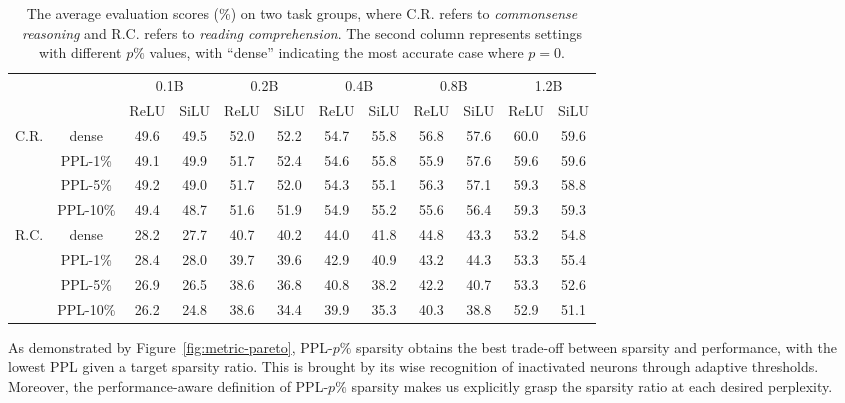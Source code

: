 \documentclass{article} %
\begin{document}
\begin{table}[t]
\caption{The average evaluation scores (\%) on two task groups, where C.R. refers to \textit{commonsense reasoning} and R.C. refers to \textit{reading comprehension}. The second column represents settings with different $p\%$ values, with ``dense'' indicating the most accurate case where $p=0$.}
\label{table:average-evaluation-results}
\footnotesize
\setlength{\tabcolsep}{1.2mm}
\begin{center}
\begin{tabular}{c|c|cccccccccc}
\toprule
\multicolumn{2}{c|}{} & \multicolumn{2}{c|}{0.1B} & \multicolumn{2}{c|}{0.2B} & \multicolumn{2}{c|}{0.4B} & \multicolumn{2}{c|}{0.8B} & \multicolumn{2}{c}{1.2B} \\  
\multicolumn{2}{c|}{} & ReLU & \multicolumn{1}{c|}{SiLU} & ReLU & \multicolumn{1}{c|}{SiLU} & ReLU & \multicolumn{1}{c|}{SiLU} & ReLU & \multicolumn{1}{c|}{SiLU} & ReLU & SiLU \\

\midrule
\multirow{4}{*}{C.R.} 
& dense  & 49.6 & 49.5 & 52.0 & 52.2 & 54.7 & 55.8 & 56.8 & 57.6 & 60.0 & 59.6 \\
& PPL-1\%  & 49.1 & 49.9 & 51.7 & 52.4 & 54.6 & 55.8 & 55.9 & 57.6 & 59.6 & 59.6 \\
& PPL-5\%  & 49.2 & 49.0 & 51.7 & 52.0 & 54.3 & 55.1 & 56.3 & 57.1 & 59.3 & 58.8 \\
& PPL-10\% & 49.4 & 48.7 & 51.6 & 51.9 & 54.9 & 55.2 & 55.6 & 56.4 & 59.3 & 59.3 \\


\midrule
\multirow{4}{*}{R.C.} 
& dense  & 28.2 & 27.7 & 40.7 & 40.2 & 44.0 & 41.8 & 44.8 & 43.3 & 53.2 & 54.8 \\
& PPL-1\%  & 28.4 & 28.0 & 39.7 & 39.6 & 42.9 & 40.9 & 43.2 & 44.3 & 53.3 & 55.4 \\
& PPL-5\%  & 26.9 & 26.5 & 38.6 & 36.8 & 40.8 & 38.2 & 42.2 & 40.7 & 53.3 & 52.6 \\
& PPL-10\% & 26.2 & 24.8 & 38.6 & 34.4 & 39.9 & 35.3 & 40.3 & 38.8 & 52.9 & 51.1 \\

\bottomrule
\end{tabular}
\end{center}
\vspace{-1em}
\end{table}

As demonstrated by Figure~\ref{fig:metric-pareto}, PPL-$p\%$ sparsity obtains the best trade-off between sparsity and performance, with the lowest PPL given a target sparsity ratio. This is brought by its wise recognition of inactivated neurons through adaptive thresholds. Moreover, the performance-aware definition of PPL-$p\%$ sparsity makes us explicitly grasp the sparsity ratio at each desired perplexity.
\end{document}

